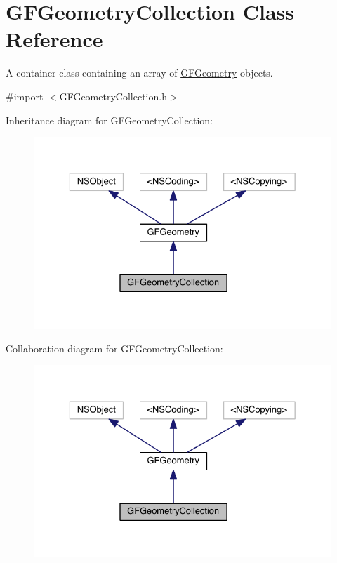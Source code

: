 \hypertarget{interface_g_f_geometry_collection}{}\section{G\+F\+Geometry\+Collection Class Reference}
\label{interface_g_f_geometry_collection}


A container class containing an array of \hyperlink{interface_g_f_geometry}{G\+F\+Geometry} objects.  




{\ttfamily \#import $<$G\+F\+Geometry\+Collection.\+h$>$}



Inheritance diagram for G\+F\+Geometry\+Collection\+:\nopagebreak
\begin{figure}[H]
\begin{center}
\leavevmode
\includegraphics[width=329pt]{interface_g_f_geometry_collection__inherit__graph}
\end{center}
\end{figure}


Collaboration diagram for G\+F\+Geometry\+Collection\+:\nopagebreak
\begin{figure}[H]
\begin{center}
\leavevmode
\includegraphics[width=329pt]{interface_g_f_geometry_collection__coll__graph}
\end{center}
\end{figure}
